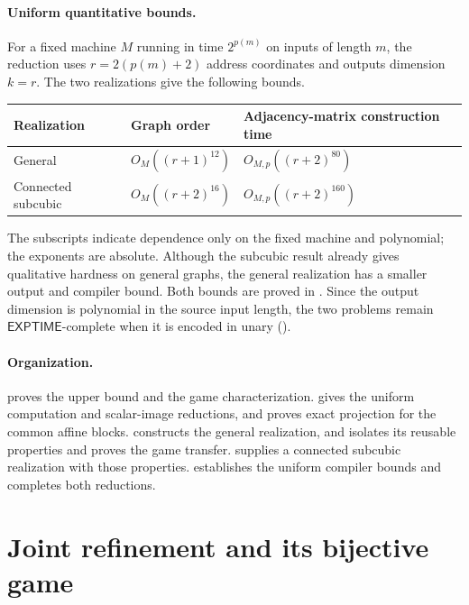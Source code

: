 \documentclass[11pt]{article}
\theoremstyle{definition}
\begin{document}
\paragraph{Uniform quantitative bounds.}
For a fixed machine \(M\) running in time \(2^{p(m)}\) on inputs of
length \(m\), the reduction uses
\(r=2(p(m)+2)\) address coordinates and outputs dimension \(k=r\).
The two realizations give the following bounds.
\begin{center}
\begin{tabular}{@{}lll@{}}
\toprule
Realization & Graph order & Adjacency-matrix construction time\\
\midrule
General & \(O_M((r+1)^{12})\) & \(O_{M,p}((r+2)^{80})\)\\
Connected subcubic & \(O_M((r+2)^{16})\) & \(O_{M,p}((r+2)^{160})\)\\
\bottomrule
\end{tabular}
\end{center}
The subscripts indicate dependence only on the fixed machine and
polynomial; the exponents are absolute. Although the subcubic result
already gives qualitative hardness on general graphs, the general
realization has a smaller output and compiler bound. Both bounds are
proved in .
Since the output dimension is polynomial in the source input length,
the two problems remain \(\mathsf{EXPTIME}\)-complete when it is encoded in
unary ().

\paragraph{Organization.}
 proves the upper bound and the game characterization.
 gives the uniform computation and scalar-image
reductions, and  proves exact projection for the
common affine blocks.  constructs the general
realization, and  isolates its reusable properties
and proves the game transfer.  supplies a connected
subcubic realization with those properties. 
establishes the uniform compiler bounds and completes both reductions.

\section{Joint refinement and its bijective game}
\label{game:section}
\end{document}

